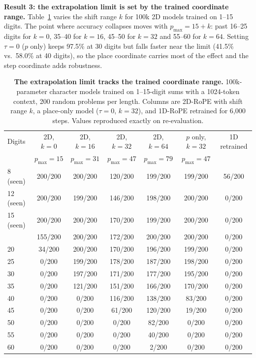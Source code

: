 \documentclass[10pt,twocolumn]{article}
\begin{document}
\textbf{Result 3: the extrapolation limit is set by the trained coordinate range.} Table~\ref{tab:ksweep} varies the shift range $k$ for 100k 2D models trained on 1--15 digits. The point where accuracy collapses moves with $p_{\max} = 15 + k$: past 16--25 digits for $k=0$, 35--40 for $k=16$, 45--50 for $k=32$ and 55--60 for $k=64$. Setting $\tau=0$ ($p$ only) keeps 97.5\% at 30 digits but falls faster near the limit (41.5\% vs.\ 58.0\% at 40 digits), so the place coordinate carries most of the effect and the step coordinate adds robustness.

\begin{table}[!t]
\centering
\footnotesize
\setlength{\tabcolsep}{4pt}
\renewcommand{\arraystretch}{1.12}
\caption{\textbf{The extrapolation limit tracks the trained coordinate range.} 100k-parameter character models trained on 1--15-digit sums with a 1024-token context, 200 random problems per length. Columns are 2D-RoPE with shift range $k$, a place-only model ($\tau = 0$, $k=32$), and 1D-RoPE retrained for 6,000 steps. Values reproduced exactly on re-evaluation.}\label{tab:ksweep}
\begin{tabular}{@{}lcccccc@{}}
\toprule
Digits & 2D, $k=0$ & 2D, $k=16$ & 2D, $k=32$ & 2D, $k=64$ & $p$ only, $k=32$ & 1D retrained \\
& $p_{\max}=15$ & $p_{\max}=31$ & $p_{\max}=47$ & $p_{\max}=79$ & $p_{\max}=47$ & \\
\midrule
8 (seen) & 200/200 & 200/200 & 120/200 & 199/200 & 199/200 & 56/200 \\
12 (seen) & 200/200 & 199/200 & 146/200 & 198/200 & 200/200 & 0/200 \\
15 (seen) & 200/200 & 200/200 & 170/200 & 199/200 & 200/200 & 0/200 \\
\addlinespace[2pt]
16 & 155/200 & 200/200 & 172/200 & 200/200 & 200/200 & 0/200 \\
20 & 34/200 & 200/200 & 170/200 & 196/200 & 199/200 & 0/200 \\
25 & 0/200 & 199/200 & 178/200 & 187/200 & 198/200 & 0/200 \\
30 & 0/200 & 197/200 & 171/200 & 177/200 & 195/200 & 0/200 \\
35 & 0/200 & 121/200 & 151/200 & 166/200 & 170/200 & 0/200 \\
40 & 0/200 & 0/200 & 116/200 & 138/200 & 83/200 & 0/200 \\
45 & 0/200 & 0/200 & 61/200 & 120/200 & 19/200 & 0/200 \\
50 & 0/200 & 0/200 & 0/200 & 82/200 & 0/200 & 0/200 \\
55 & 0/200 & 0/200 & 0/200 & 40/200 & 0/200 & 0/200 \\
60 & 0/200 & 0/200 & 0/200 & 2/200 & 0/200 & 0/200 \\
\bottomrule
\end{tabular}
\end{table}
\end{document}
